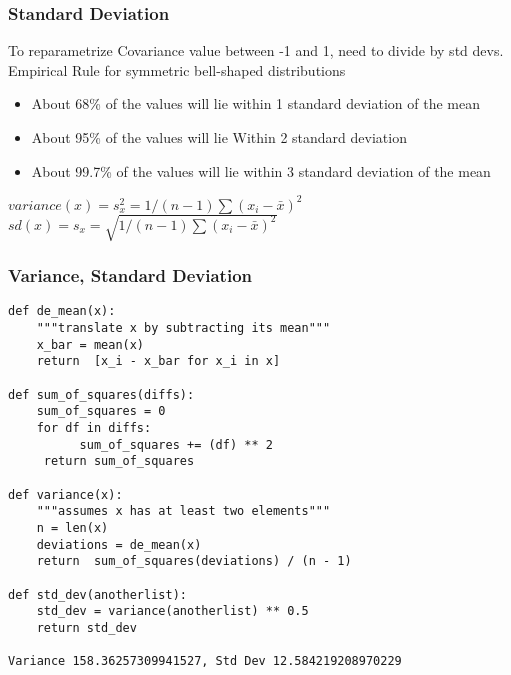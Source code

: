 \begin{frame}[fragile]\frametitle{Standard Deviation}	
To reparametrize Covariance value between -1 and 1, need to divide by std devs. Empirical Rule for symmetric bell-shaped distributions
\begin{itemize}
\item About 68\% of the values will lie within 1 standard deviation of the mean
\item About 95\% of the values will lie Within 2 standard deviation 
\item About 99.7\% of the values will lie within 3 standard deviation of the mean
\end{itemize}
$variance(x) = s_x^2 = 1/(n-1)\sum (x_i - \bar{x})^2$
$sd(x) = s_x = \sqrt{1/(n-1)\sum (x_i - \bar{x})^2}$
\end{frame}

 


\begin{frame}[fragile]\frametitle{Variance, Standard Deviation}
\begin{lstlisting}
def de_mean(x):
	"""translate x by subtracting its mean"""
	x_bar = mean(x)
	return	[x_i - x_bar for x_i in x]

def sum_of_squares(diffs):
	sum_of_squares = 0
	for df in diffs:
          sum_of_squares += (df) ** 2
     return sum_of_squares

def variance(x):
	"""assumes x has at	least two elements"""
	n = len(x)
	deviations = de_mean(x)
	return	sum_of_squares(deviations) / (n - 1)
 
def std_dev(anotherlist):
	std_dev = variance(anotherlist) ** 0.5
	return std_dev

Variance 158.36257309941527, Std Dev 12.584219208970229
\end{lstlisting}
\end{frame}


